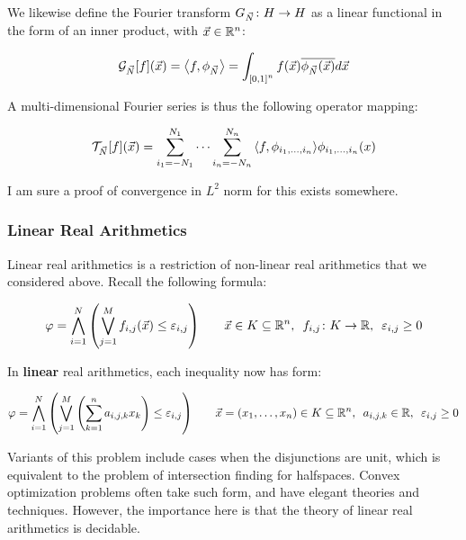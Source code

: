 \documentclass[12pt]{article}
\begin{document}
We likewise define the
Fourier transform ${G_{\vec{N}} \colon H \to H}$ as a
linear functional in the form of an inner product,
with $\vec{x} \in {\mathbb{R}}^n$:

\begin{align*}
  \mathcal{G}_{\vec{N}} {\left[f\right]} {\left(\vec{x}\right)}
    = {\left\langle f, \phi_{\vec{N}}\right\rangle}
    = \int_{{\left[0, 1\right]}^n}
      f{\left(\vec{x}\right)} \overline{\phi_{\vec{N}} {\left(\vec{x}\right)}} d \vec{x}
\end{align*}

A multi-dimensional Fourier series is thus the following operator mapping:

\begin{align*}
  \mathcal{T}_{\vec{N}} {\left[f\right]}{\left(\vec{x}\right)}
    = \sum_{i_1 = -N_1}^{N_1} \cdots \sum_{i_n = -N_n}^{N_n}
        {\left\langle f, \phi_{i_1, \ldots, i_n}\right\rangle} \phi_{i_1, \ldots, i_n} {\left(x\right)}
\end{align*}

I am sure a proof of convergence in $L^2$ norm for this exists somewhere.


\subsubsection{Linear Real Arithmetics}
Linear real arithmetics is a restriction of non-linear real arithmetics
that we considered above.
Recall the following formula:

\begin{align*}
  \varphi
    = \bigwedge_{i = 1}^{N} {\left(\bigvee_{j = 1}^{M}
        f_{i, j}{\left(\vec{x}\right)} \leq \varepsilon_{i, j}\right)}
  \qquad
  \vec{x} \in K \subseteq {\mathbb{R}}^n, \enskip
  {f_{i, j} \colon K \to {\mathbb{R}}}, \enskip
  \varepsilon_{i, j} \geq 0
\end{align*}

In \textbf{linear} real arithmetics, each inequality now has form:

\begin{align*}
  \varphi
    = \bigwedge_{i = 1}^{N} {\left(\bigvee_{j = 1}^{M}
        {\left(\sum_{k = 1}^{n} a_{i, j, k} x_k\right)} \leq \varepsilon_{i, j}\right)}
  \qquad
  \vec{x} = {\left(x_1, \ldots, x_n\right)} \in K \subseteq {\mathbb{R}}^n, \enskip
  a_{i, j, k} \in {\mathbb{R}}, \enskip
  \varepsilon_{i, j} \geq 0
\end{align*}

Variants of this problem include cases when the disjunctions
are unit, which is equivalent to the problem of intersection finding for
halfspaces.
Convex optimization problems often take such form, and have elegant
theories and techniques.
However, the importance here is that the theory of linear real arithmetics
is decidable.
\end{document}
